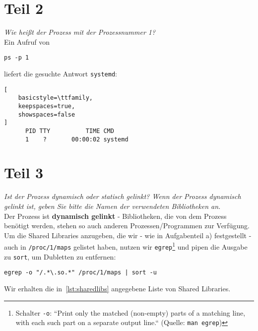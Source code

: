 \section{Teil 2}

\textit{Wie heißt der Prozess mit der Prozessnummer 1?}\\

\noindent
Ein Aufruf von

\begin{center}
\texttt{ps -p 1}
\end{center}

\noindent
liefert die gesuchte Antwort \texttt{systemd}:\\

\begin{lstlisting}[
    basicstyle=\ttfamily,
    keepspaces=true,
    showspaces=false
]
      PID TTY          TIME CMD
      1    ?       00:00:02 systemd
\end{lstlisting}

\section{Teil 3}

\textit{Ist der Prozess dynamisch oder statisch gelinkt? Wenn der Prozess
dynamisch gelinkt ist, geben Sie bitte die Namen der verwendeten Bibliotheken an.}\\

\noindent
Der Prozess ist \textbf{dynamisch gelinkt} - Bibliotheken, die von dem Prozess benötigt werden, stehen so auch anderen Prozessen/Programmen zur Verfügung.\\

\noindent
Um die Shared Libraries anzugeben, die wir  - wie in Aufgabenteil a) festgestellt - auch in \texttt{/proc/1/maps} gelistet haben, nutzen wir \texttt{egrep}\footnote{
Schalter \texttt{-o}: ``Print only the matched (non-empty) parts of a matching line, with each such part on a separate output line.`` (Quelle: \texttt{man egrep})
} und pipen die Ausgabe zu \texttt{sort}, um Dubletten zu entfernen:

\begin{center}
\begin{verbatim}
egrep -o "/.*\.so.*" /proc/1/maps | sort -u
\end{verbatim}
\end{center}

\noindent
Wir erhalten die in~\ref{lst:sharedlibs} angegebene Liste von Shared Libraries.


